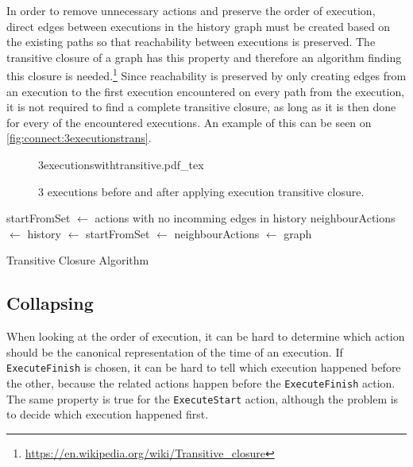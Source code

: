 	
	
	\newpar In order to remove unnecessary actions and preserve the order of execution, direct edges between executions in the history graph must be created based on the existing paths so that reachability between executions is preserved. The transitive closure of a graph has this property and therefore an algorithm finding this closure is needed.\footnote{\url{https://en.wikipedia.org/wiki/Transitive_closure}} Since reachability is preserved by only creating edges from an execution to the first execution encountered on every path from the execution, it is not required to find a complete transitive closure, as long as it is then done for every of the encountered executions. An example of this can be seen on \autoref{fig:connect:3executionstrans}.
	
	\begin{figure}
		\centering
		\def\svgwidth{0.42\columnwidth}
		\fontsize{6}{8}\selectfont
		{3executionswithtransitive.pdf_tex}
		\caption{3 executions before and after applying execution transitive closure.}
		\label{fig:connect:3executionstrans}
	\end{figure}
	
	\begin{algorithm}
		\begin{algorithmic}
			\State startFromSet $\leftarrow$ actions with no incomming edges in history
				\State neighbourActions $\leftarrow$ 
						\State history $\leftarrow$ 
						\State startFromSet $\leftarrow$ 
					\Else
						\State neighbourActions $\leftarrow$ 
					\EndIf
				\EndFor
			\EndFor
			\State 
			\Return graph
		\EndFunction
		\end{algorithmic}
		\caption{Transitive Closure Algorithm}
	\end{algorithm}

	\subsection{Collapsing}
	When looking at the order of execution, it can be hard to determine which action should be the canonical representation of the time of an execution. If \texttt{ExecuteFinish} is chosen, it can be hard to tell which execution happened before the other, because the related actions happen before the \texttt{ExecuteFinish} action. The same property is true for the \texttt{ExecuteStart} action, although the problem is to decide which execution happened first.
	
